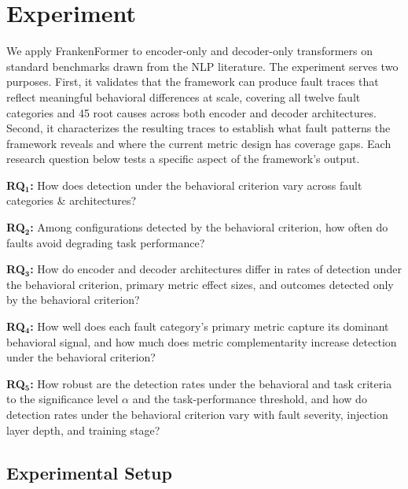\section{Experiment}
\label{sec:mutation-analysis}
We apply FrankenFormer to encoder-only and decoder-only transformers on standard benchmarks drawn from the NLP literature. The experiment serves two purposes. First, it validates that the framework can produce fault traces that reflect meaningful behavioral differences at scale, covering all twelve fault categories and 45 root causes across both encoder and decoder architectures. Second, it characterizes the resulting traces to establish what fault patterns the framework reveals and where the current metric design has coverage gaps. Each research question below tests a specific aspect of the framework's output.
\begin{rqlist}
\item \textbf{RQ$\mathbf{_1}$:} How does detection under the behavioral criterion vary across fault categories \& architectures?
\item \textbf{RQ$\mathbf{_2}$:} Among configurations detected by the behavioral criterion, how often do faults avoid degrading task performance?
\item \textbf{RQ$\mathbf{_3}$:} How do encoder and decoder architectures differ in rates of detection under the behavioral criterion, primary metric effect sizes, and outcomes detected only by the behavioral criterion?
\item \textbf{RQ$\mathbf{_4}$:} How well does each fault category’s primary metric capture its dominant behavioral signal, and how much does metric complementarity increase detection under the behavioral criterion?
\item \textbf{RQ$\mathbf{_5}$:} How robust are the detection rates under the behavioral and task criteria to the significance level $\alpha$ and the task-performance threshold, and how do detection rates under the behavioral criterion vary with fault severity, injection layer depth, and training stage?
\end{rqlist}

\subsection{Experimental Setup}
\label{sec:experiments-dataset}

